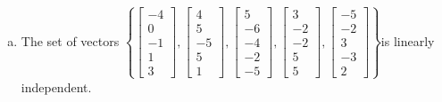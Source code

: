 \begin{exerciseAnswer}
\begin{enumerate}[(a)]
\item  The set of vectors \( \left\{ \left[\begin{array}{c}
-4 \\
0 \\
-1 \\
1 \\
3
\end{array}\right] , \left[\begin{array}{c}
4 \\
5 \\
-5 \\
5 \\
1
\end{array}\right] , \left[\begin{array}{c}
5 \\
-6 \\
-4 \\
-2 \\
-5
\end{array}\right] , \left[\begin{array}{c}
3 \\
-2 \\
-2 \\
5 \\
5
\end{array}\right] , \left[\begin{array}{c}
-5 \\
-2 \\
3 \\
-3 \\
2
\end{array}\right] \right\} \)is linearly independent.
\end{enumerate}
    
\end{exerciseAnswer}
    
